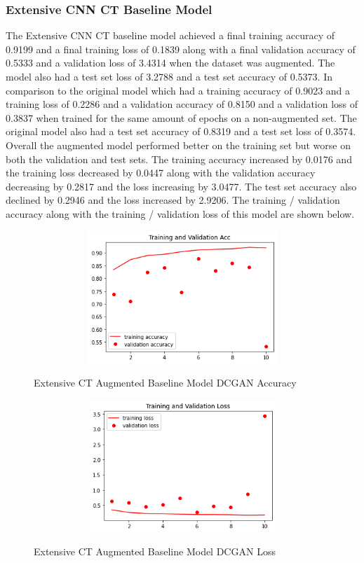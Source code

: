 \subsubsection{Extensive CNN CT Baseline Model}
The Extensive CNN CT baseline model achieved a final training accuracy of 0.9199 and a final training loss of 0.1839 along with a final validation accuracy of 0.5333 and a validation loss of 3.4314  when the dataset was augmented.  The model  also had a test set loss of 3.2788  and a test set accuracy of  0.5373. In comparison to the original model which had a training accuracy of 0.9023 and a training loss of 0.2286 and a validation accuracy of 0.8150 and a validation loss of 0.3837  when trained for the same amount of epochs on a non-augmented set.  The original model also had a test set accuracy of 0.8319 and a test set loss of 0.3574.  Overall the augmented model performed better on the training set but worse on both the validation and test sets.  The training accuracy increased by 0.0176 and the training loss decreased by 0.0447 along with the validation accuracy decreasing by 0.2817 and the loss increasing by 3.0477. The test set accuracy also declined by 0.2946 and the loss increased by 2.9206.  The training / validation accuracy along with the training / validation loss of this model are shown below.
 \begin{figure}[H]
    \centering    \includegraphics[width=1\textwidth,height=5cm,keepaspectratio]{Images/ExtensiveCNNBaselineModelExtensiveCovidAccCTAugmentedDCGAN.png}\\
    \caption{Extensive CT Augmented Baseline Model DCGAN Accuracy}
    \label{fig:Extensive CT Augmented Baseline Model DCGAN Accuracy}
\end{figure}
 \begin{figure}[H]
    \centering
    \includegraphics[width=1\textwidth,height=5cm,keepaspectratio]{Images/ExtensiveCNNBaselineModelExtensiveCovidLossCTAugmentedDCGAN.png}\\
    \caption{Extensive CT Augmented Baseline Model DCGAN Loss}
    \label{fig:Extensive CT Augmented Baseline Model DCGAN Loss}
\end{figure}
